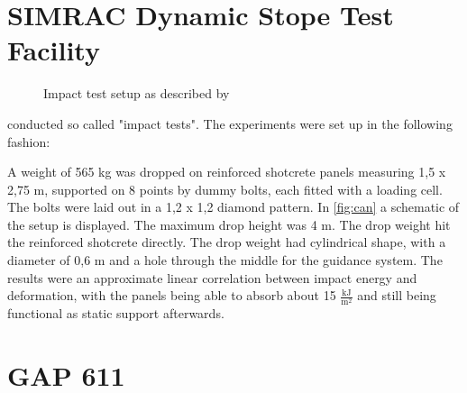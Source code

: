 \section{SIMRAC Dynamic Stope Test Facility}

\begin{figure}
\centering

\caption{Impact test setup as described by \\ \textcite{canada96}}
\label{fig:can}
\end{figure}

\Textcite[4.24]{canada96} conducted so called "impact tests". 
The experiments were set up in the following fashion:

A weight of 565 kg was dropped on reinforced shotcrete panels measuring 1,5 x 2,75 m, supported on 8 points by dummy bolts, each fitted with a loading cell. The bolts were laid out in a 1,2 x 1,2 diamond pattern.  In \autoref{fig:can} a schematic of the setup is displayed. The maximum drop height was 4 m. The drop weight hit the reinforced shotcrete directly. The drop weight had cylindrical shape, with a diameter of 0,6 m and a hole through the middle for the guidance system.
The results were an approximate linear correlation between impact energy and deformation, with the panels being able to absorb about 15 \(\frac{\text{kJ}}{\text{m}^2}\) and still being functional as static support afterwards.

\section{GAP 611}


